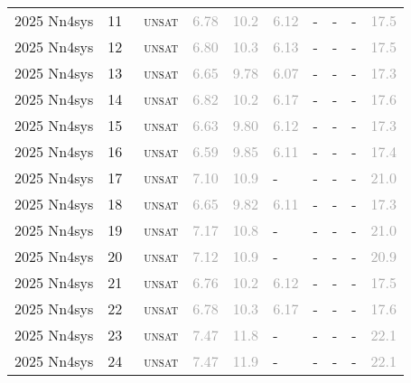 \begin{center}
{\begin{longtable}{@{}llllllllll@{}}
2025 Nn4sys & 11 & ~\textsc{unsat} & \textcolor{darkgray}{6.78} & \textcolor{darkgray}{10.2} & \textcolor{darkgray}{6.12} & - & - & - & \textcolor{darkgray}{17.5} \\
2025 Nn4sys & 12 & ~\textsc{unsat} & \textcolor{darkgray}{6.80} & \textcolor{darkgray}{10.3} & \textcolor{darkgray}{6.13} & - & - & - & \textcolor{darkgray}{17.5} \\
2025 Nn4sys & 13 & ~\textsc{unsat} & \textcolor{darkgray}{6.65} & \textcolor{darkgray}{9.78} & \textcolor{darkgray}{6.07} & - & - & - & \textcolor{darkgray}{17.3} \\
2025 Nn4sys & 14 & ~\textsc{unsat} & \textcolor{darkgray}{6.82} & \textcolor{darkgray}{10.2} & \textcolor{darkgray}{6.17} & - & - & - & \textcolor{darkgray}{17.6} \\
2025 Nn4sys & 15 & ~\textsc{unsat} & \textcolor{darkgray}{6.63} & \textcolor{darkgray}{9.80} & \textcolor{darkgray}{6.12} & - & - & - & \textcolor{darkgray}{17.3} \\
2025 Nn4sys & 16 & ~\textsc{unsat} & \textcolor{darkgray}{6.59} & \textcolor{darkgray}{9.85} & \textcolor{darkgray}{6.11} & - & - & - & \textcolor{darkgray}{17.4} \\
2025 Nn4sys & 17 & ~\textsc{unsat} & \textcolor{darkgray}{7.10} & \textcolor{darkgray}{10.9} & - & - & - & - & \textcolor{darkgray}{21.0} \\
2025 Nn4sys & 18 & ~\textsc{unsat} & \textcolor{darkgray}{6.65} & \textcolor{darkgray}{9.82} & \textcolor{darkgray}{6.11} & - & - & - & \textcolor{darkgray}{17.3} \\
2025 Nn4sys & 19 & ~\textsc{unsat} & \textcolor{darkgray}{7.17} & \textcolor{darkgray}{10.8} & - & - & - & - & \textcolor{darkgray}{21.0} \\
2025 Nn4sys & 20 & ~\textsc{unsat} & \textcolor{darkgray}{7.12} & \textcolor{darkgray}{10.9} & - & - & - & - & \textcolor{darkgray}{20.9} \\
2025 Nn4sys & 21 & ~\textsc{unsat} & \textcolor{darkgray}{6.76} & \textcolor{darkgray}{10.2} & \textcolor{darkgray}{6.12} & - & - & - & \textcolor{darkgray}{17.5} \\
2025 Nn4sys & 22 & ~\textsc{unsat} & \textcolor{darkgray}{6.78} & \textcolor{darkgray}{10.3} & \textcolor{darkgray}{6.17} & - & - & - & \textcolor{darkgray}{17.6} \\
2025 Nn4sys & 23 & ~\textsc{unsat} & \textcolor{darkgray}{7.47} & \textcolor{darkgray}{11.8} & - & - & - & - & \textcolor{darkgray}{22.1} \\
2025 Nn4sys & 24 & ~\textsc{unsat} & \textcolor{darkgray}{7.47} & \textcolor{darkgray}{11.9} & - & - & - & - & \textcolor{darkgray}{22.1} \\

\end{longtable}}
\end{center}
